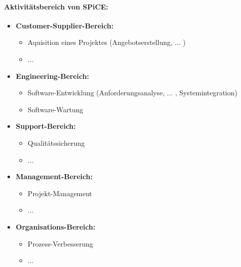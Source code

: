 \paragraph{Aktivitätsbereich von SPiCE:}
\begin{itemize}
	\item \textbf{Customer-Supplier-Bereich:} 
	\begin{itemize}
		\item Aquisition eines Projektes (Angebotserstellung, ... )
		\item ...
	\end{itemize}
	\item \textbf{Engineering-Bereich:} 
	\begin{itemize}
		\item Software-Entwicklung (Anforderungsanalyse, ... , Systemintegration)
		\item Software-Wartung
	\end{itemize}
	\item \textbf{Support-Bereich:} 
	\begin{itemize}
		\item Qualitätssicherung
		\item ...
	\end{itemize}
	\item \textbf{Management-Bereich:} 
	\begin{itemize}
		\item Projekt-Management
		\item ...
	\end{itemize}
	\item \textbf{Organisations-Bereich:} 
	\begin{itemize}
		\item Prozess-Verbesserung
		\item ...
	\end{itemize}
\end{itemize}

